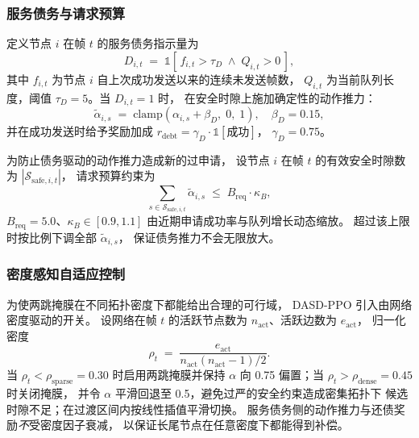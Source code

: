 \subsubsection{服务债务与请求预算}

定义节点 $i$ 在帧 $t$ 的服务债务指示量为
\begin{equation}
D_{i,t} \;=\; \mathbb{1}\!\left[\, f_{i,t} > \tau_D \;\land\; Q_{i,t} > 0 \,\right],
\end{equation}
其中 $f_{i,t}$ 为节点 $i$ 自上次成功发送以来的连续未发送帧数，
$Q_{i,t}$ 为当前队列长度，阈值 $\tau_D=5$。当 $D_{i,t}=1$ 时，
在安全时隙上施加确定性的动作推力：
\begin{equation}
\tilde{\alpha}_{i,s} \;=\; \mathrm{clamp}\!\left(\alpha_{i,s} + \beta_D,\; 0,\; 1\right),
\quad \beta_D = 0.15,
\label{eq:debt-boost}
\end{equation}
并在成功发送时给予奖励加成
$r_{\mathrm{debt}} = \gamma_D \cdot \mathbb{1}[\text{成功}]$，
$\gamma_D=0.75$。

为防止债务驱动的动作推力造成新的过申请，
设节点 $i$ 在帧 $t$ 的有效安全时隙数为 $|\mathcal{S}_{\mathrm{safe},i,t}|$，
请求预算约束为
\begin{equation}
\sum_{s \in \mathcal{S}_{\mathrm{safe},i,t}} \tilde{\alpha}_{i,s}
\;\le\; B_{\mathrm{req}} \cdot \kappa_{B},
\label{eq:budget}
\end{equation}
$B_{\mathrm{req}}=5.0$、$\kappa_B \in [0.9, 1.1]$ 由近期申请成功率与队列增长动态缩放。
超过该上限时按比例下调全部 $\tilde{\alpha}_{i,s}$，
保证债务推力不会无限放大。

\subsubsection{密度感知自适应控制}

为使两跳掩膜在不同拓扑密度下都能给出合理的可行域，
DASD-PPO 引入由网络密度驱动的开关。
设网络在帧 $t$ 的活跃节点数为 $n_{\mathrm{act}}$、活跃边数为 $e_{\mathrm{act}}$，
归一化密度
\begin{equation}
\rho_t \;=\; \frac{e_{\mathrm{act}}}{n_{\mathrm{act}}(n_{\mathrm{act}}-1)/2}.
\label{eq:density}
\end{equation}
当 $\rho_t < \rho_{\mathrm{sparse}}=0.30$ 时启用两跳掩膜并保持 $\alpha$
向 0.75 偏置；当 $\rho_t > \rho_{\mathrm{dense}}=0.45$ 时关闭掩膜，
并令 $\alpha$ 平滑回退至 0.5，避免过严的安全约束造成密集拓扑下
候选时隙不足；在过渡区间内按线性插值平滑切换。
服务债务侧的动作推力与还债奖励\emph{不}受密度因子衰减，
以保证长尾节点在任意密度下都能得到补偿。

